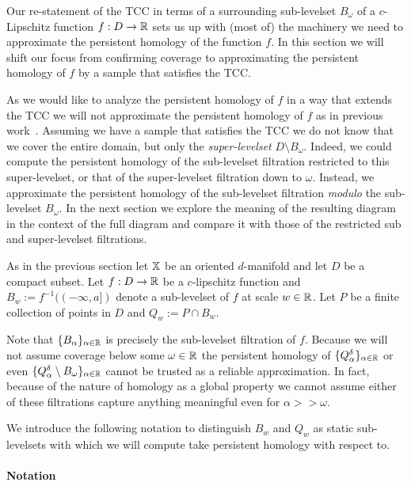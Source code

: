
Our re-statement of the TCC in terms of a surrounding sub-levelset $B_\omega$ of a $c$-Lipschitz function $f : D\to \mathbb{R}$ sets us up with (most of) the machinery we need to approximate the persistent homology of the function $f$.
In this section we will shift our focus from confirming coverage to approximating the persistent homology of $f$ by a sample that satisfies the TCC.

As we would like to analyze the persistent homology of $f$ in a way that extends the TCC we will not approximate the persistent homology of $f$ as in previous work~\cite{chazal09analysis}.
Assuming we have a sample that satisfies the TCC we do not know that we cover the entire domain, but only the \emph{super-levelset} $D\setminus B_\omega$.
Indeed, we could compute the persistent homology of the sub-levelset filtration restricted to this super-levelset, or that of the super-levelset filtration down to $\omega$.
Instead, we approximate the persistent homology of the sub-levelset filtration \emph{modulo} the sub-levelset $B_\omega$.
In the next section we explore the meaning of the resulting diagram in the context of the full diagram and compare it with those of the restricted sub and super-levelset filtrations.

As in the previous section let $\mathbb{X}$ be an oriented $d$-manifold and let $D$ be a compact subset.
Let $f: D\to\mathbb{R}$ be a $c$-lipschitz function and $B_w := f^{-1}((-\infty,a])$ denote a sub-levelset of $f$ at scale $w\in\mathbb{R}$.
Let $P$ be a finite collection of points in $D$ and $Q_w := P\cap B_w$.

Note that $\{B_\alpha\}_{\alpha\in\mathbb{R}}$ is precisely the sub-levelset filtration of $f$.
Because we will not assume coverage below some $\omega\in\mathbb{R}$ the persistent homology of $\{Q_\alpha^\delta\}_{\alpha\in\mathbb{R}}$ or even $\{Q_\alpha^\delta\setminus B_\omega\}_{\alpha\in\mathbb{R}}$ cannot be trusted as a reliable approximation.
In fact, because of the nature of homology as a global property we cannot assume either of these filtrations capture anything meaningful even for $\alpha >> \omega$.

We introduce the following notation to distinguish $B_w$ and $Q_w$ as static sub-levelsets with which we will compute take persistent homology with respect to.

\paragraph{Notation}

